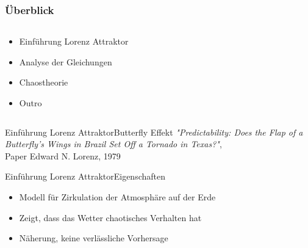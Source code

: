 \documentclass[presentation.tex]{subfiles}
\begin{document}
	\frame{\titlepage}
    
    \begin{frame}
        \frametitle{Überblick}
        \begin{columns}
        	\begin{column}{0.6\linewidth}
        		\begin{itemize}
        			\item Einführung Lorenz Attraktor
        			\item Analyse der Gleichungen
        			\item Chaostheorie
        			\item Outro
        		\end{itemize}
        	\end{column}
        	\begin{column}{0.4\linewidth}
        		\begin{figure}
				\centering
				\label{fig:lorenz-modell}
				\end{figure}
        	\end{column}
        \end{columns}
    \end{frame}
    
    \begin{frame}{Einführung Lorenz Attraktor}{Butterfly Effekt}
		\textit{"Predictability: Does the Flap of a Butterfly's Wings in Brazil Set Off a Tornado in Texas?"}, \\
		Paper Edward N. Lorenz, 1979
    \end{frame}
    
    \begin{frame}{Einführung Lorenz Attraktor}{Eigenschaften}
    	\begin{itemize}
    		\item Modell für Zirkulation der Atmosphäre auf der Erde
    		\item Zeigt, dass das Wetter chaotisches Verhalten hat
    		\item Näherung, keine verlässliche Vorhersage
    	\end{itemize}
    \end{frame}
    
\end{document}
